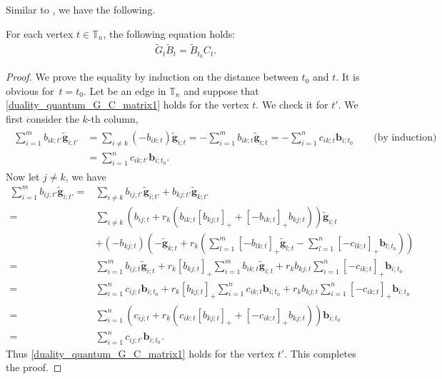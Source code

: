 Similar to \cite[equation (6.14)]{fomin_zelevinsky_2007}, we have the following.
\begin{Proposition}
 For each vertex $t\in \mathbb{T}_n$, the following equation holds:
 \begin{align}\label{duality_quantum_G_C_matrix1}
 \tilde{G}_{t}\tilde{B}_{t}=\tilde{B}_{t_0}C_{t}.
 \end{align}
\end{Proposition}
\begin{proof}

 We prove the equality by induction on the distance between $t_0$ and $t$.
 It is obvious for~${t=t_0}$. Let  be an edge in $\mathbb{T}_n$ and suppose that \eqref{duality_quantum_G_C_matrix1} holds for the vertex $t$. We check it for $t'$. We first consider the $k$-th column,
 \begin{align*}
 \begin{aligned}
 \sum\limits^{m}_{i=1}b_{ik;t'}\mathbf{\tilde{g}}_{i;t'}
 &=\sum\limits_{i\neq k}(-b_{ik;t})\mathbf{\tilde{g}}_{i;t}=-\sum\limits^{m}_{i=1}b_{ik;t}\mathbf{\tilde{g}}_{i;t}=-\sum\limits^{n}_{i=1}c_{ik;t}\mathbf{b}_{i;t_0}\qquad
 \text{(by induction)}\\
 &=\sum\limits^{n}_{i=1}c_{ik;t'}\mathbf{b}_{i;t_0}.
 \end{aligned}
 \end{align*}
 Now let $j\neq k$, we have
 \begin{align*}
 \sum\limits^{m}_{i=1}b_{ij;t'}\mathbf{\tilde{g}}_{i;t'}
 ={}&\sum\limits_{i\neq k}b_{ij;t'}\mathbf{\tilde{g}}_{i;t'}+b_{kj;t'}\mathbf{\tilde{g}}_{k;t'}\\
 ={}&\sum\limits_{i\neq k}(b_{ij;t}+r_{k}(b_{ik;t}[b_{kj;t}]_{+}+[-b_{ik;t}]_{+}b_{kj;t}))\mathbf{\tilde{g}}_{i;t}\\
 & +(-b_{kj;t})\left(-\mathbf{\tilde{g}}_{k;t}+r_{k}\left(\sum\limits^{m}_{l=1}[-b_{lk;t}]_{+}\mathbf{\tilde{g}}_{l;t}-\sum\limits^{n}_{l=1}[-c_{lk;t}]_{+}\mathbf{b}_{l;t_0}\right)\right)\\
 ={}&\sum\limits^{m}_{i=1}b_{ij;t}\mathbf{\tilde{g}}_{i;t}+r_{k}[b_{kj;t}]_{+}\sum\limits^{m}_{i=1}b_{ik;t}\mathbf{\tilde{g}}_{i;t}+r_{k}b_{kj;t}\sum\limits^{n}_{i=1}[-c_{ik;t}]_{+}\mathbf{b}_{i;t_0}\\
 ={}&\sum\limits_{i=1}^{n}c_{ij;t}\mathbf{b}_{i;t_0}+r_{k}[b_{kj;t}]_{+}\sum\limits^{n}_{i=1}c_{ik;t}\mathbf{b}_{i;t_0}+r_{k}b_{kj;t}\sum\limits^{n}_{i=1}[-c_{ik;t}]_{+}\mathbf{b}_{i;t_0}\\
 ={}&\sum\limits_{i=1}^{n}(c_{ij;t}+r_{k}(c_{ik;t}[b_{kj;t}]_{+}+[-c_{ik;t}]_{+}b_{kj;t}))\mathbf{b}_{i;t_0}\\
 ={}&\sum\limits_{i=1}^{n}c_{ij;t'}\mathbf{b}_{i;t_0}.
 \end{align*}
 Thus \eqref{duality_quantum_G_C_matrix1} holds for the vertex $t'$. This completes the proof.
\end{proof}

